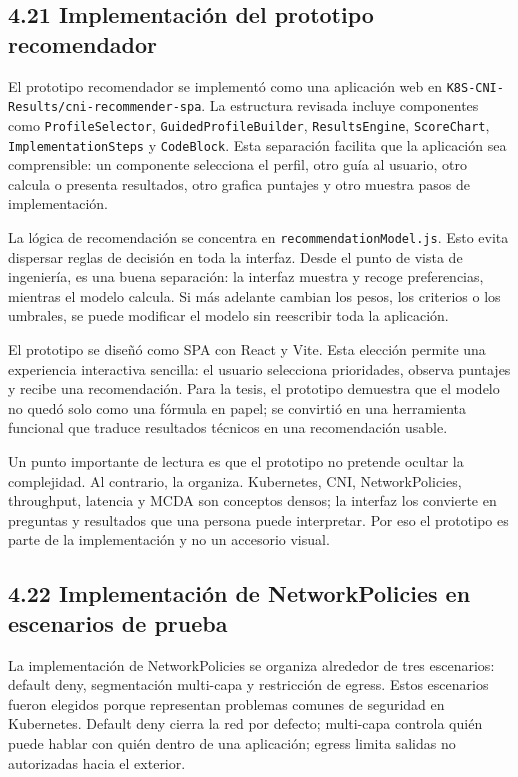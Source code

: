 \documentclass[journal]{IEEEtran}
\begin{document}
\subsection{4.21 Implementación del prototipo recomendador}

El prototipo recomendador se implementó como una aplicación web en \texttt{K8S-CNI-Results/cni-recommender-spa}. La estructura revisada incluye componentes como \texttt{ProfileSelector}, \texttt{GuidedProfileBuilder}, \texttt{ResultsEngine}, \texttt{ScoreChart}, \texttt{ImplementationSteps} y \texttt{CodeBlock}. Esta separación facilita que la aplicación sea comprensible: un componente selecciona el perfil, otro guía al usuario, otro calcula o presenta resultados, otro grafica puntajes y otro muestra pasos de implementación.

La lógica de recomendación se concentra en \texttt{recommendationModel.js}. Esto evita dispersar reglas de decisión en toda la interfaz. Desde el punto de vista de ingeniería, es una buena separación: la interfaz muestra y recoge preferencias, mientras el modelo calcula. Si más adelante cambian los pesos, los criterios o los umbrales, se puede modificar el modelo sin reescribir toda la aplicación.

El prototipo se diseñó como SPA con React y Vite. Esta elección permite una experiencia interactiva sencilla: el usuario selecciona prioridades, observa puntajes y recibe una recomendación. Para la tesis, el prototipo demuestra que el modelo no quedó solo como una fórmula en papel; se convirtió en una herramienta funcional que traduce resultados técnicos en una recomendación usable.

Un punto importante de lectura es que el prototipo no pretende ocultar la complejidad. Al contrario, la organiza. Kubernetes, CNI, NetworkPolicies, throughput, latencia y MCDA son conceptos densos; la interfaz los convierte en preguntas y resultados que una persona puede interpretar. Por eso el prototipo es parte de la implementación y no un accesorio visual.

\subsection{4.22 Implementación de NetworkPolicies en escenarios de prueba}

La implementación de NetworkPolicies se organiza alrededor de tres escenarios: default deny, segmentación multi-capa y restricción de egress. Estos escenarios fueron elegidos porque representan problemas comunes de seguridad en Kubernetes. Default deny cierra la red por defecto; multi-capa controla quién puede hablar con quién dentro de una aplicación; egress limita salidas no autorizadas hacia el exterior.
\end{document}
